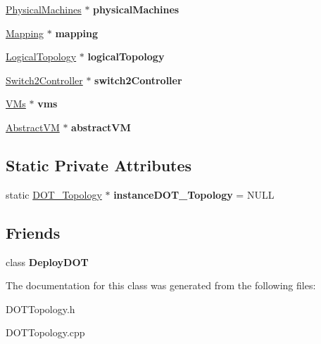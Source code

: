 \begin{DoxyCompactItemize}
\item 
\hypertarget{classDOT__Topology_ad711e4c936235ab77646ea40a2daf45b}{\hyperlink{classPhysicalMachines}{\-Physical\-Machines} $\ast$ {\bfseries physical\-Machines}}\label{classDOT__Topology_ad711e4c936235ab77646ea40a2daf45b}

\item 
\hypertarget{classDOT__Topology_a751ba4de2c8803313a3c8e703a976bf6}{\hyperlink{classMapping}{\-Mapping} $\ast$ {\bfseries mapping}}\label{classDOT__Topology_a751ba4de2c8803313a3c8e703a976bf6}

\item 
\hypertarget{classDOT__Topology_a4690560d8b8c920f00b9fe93997ceb95}{\hyperlink{classLogicalTopology}{\-Logical\-Topology} $\ast$ {\bfseries logical\-Topology}}\label{classDOT__Topology_a4690560d8b8c920f00b9fe93997ceb95}

\item 
\hypertarget{classDOT__Topology_acfd5ec74d141295af97e074e6eb14cb2}{\hyperlink{classSwitch2Controller}{\-Switch2\-Controller} $\ast$ {\bfseries switch2\-Controller}}\label{classDOT__Topology_acfd5ec74d141295af97e074e6eb14cb2}

\item 
\hypertarget{classDOT__Topology_ad36489d8b010a33cbb3a6c03a36b8807}{\hyperlink{classVMs}{\-V\-Ms} $\ast$ {\bfseries vms}}\label{classDOT__Topology_ad36489d8b010a33cbb3a6c03a36b8807}

\item 
\hypertarget{classDOT__Topology_ae5cb9e2e5f3c3951ab5e4851850d1744}{\hyperlink{classAbstractVM}{\-Abstract\-V\-M} $\ast$ {\bfseries abstract\-V\-M}}\label{classDOT__Topology_ae5cb9e2e5f3c3951ab5e4851850d1744}

\end{DoxyCompactItemize}
\subsection*{\-Static \-Private \-Attributes}
\begin{DoxyCompactItemize}
\item 
\hypertarget{classDOT__Topology_ab1a48f2467afaa904af2464cb23773b5}{static \hyperlink{classDOT__Topology}{\-D\-O\-T\-\_\-\-Topology} $\ast$ {\bfseries instance\-D\-O\-T\-\_\-\-Topology} = \-N\-U\-L\-L}\label{classDOT__Topology_ab1a48f2467afaa904af2464cb23773b5}

\end{DoxyCompactItemize}
\subsection*{\-Friends}
\begin{DoxyCompactItemize}
\item 
\hypertarget{classDOT__Topology_a9196fbfe1bc6aab5e58b637f58cb917c}{class {\bfseries \-Deploy\-D\-O\-T}}\label{classDOT__Topology_a9196fbfe1bc6aab5e58b637f58cb917c}

\end{DoxyCompactItemize}


\-The documentation for this class was generated from the following files\-:\begin{DoxyCompactItemize}
\item 
\-D\-O\-T\-Topology.\-h\item 
\-D\-O\-T\-Topology.\-cpp\end{DoxyCompactItemize}
